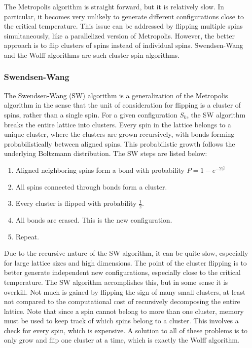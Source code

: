 \documentclass[a4paper]{article}
\begin{document}
The Metropolis algorithm is straight forward, but it is relatively slow. In particular, it becomes very unlikely to generate different configurations close to the critical temperature. This issue can be addressed by flipping multiple spins simultaneously, like a parallelized version of Metropolis. However, the better approach is to flip clusters of spins instead of individual spins. Swendsen-Wang and the Wolff algorithms are such cluster spin algorithms.

\subsubsection{Swendsen-Wang}

The Swendsen-Wang (SW) algorithm is a generalization of the Metropolis algorithm in the sense that the unit of consideration for flipping is a cluster of spins, rather than a single spin. For a given configuration $S_{k}$, the SW algorithm breaks the entire lattice into clusters. Every spin in the lattice belongs to a unique cluster, where the clusters are grown recursively, with bonds forming probabilistically between aligned spins. This probabilistic growth follows the underlying Boltzmann distribution. The SW steps are listed below:

\begin{enumerate}
	\item Aligned neighboring spins form a bond with probability $P=1-e^{-2\beta}$
	\item All spins connected through bonds form a cluster.
	\item Every cluster is flipped with probability $\frac{1}{2}$.
	\item All bonds are erased. This is the new configuration.
	\item Repeat.
\end{enumerate}

Due to the recursive nature of the SW algorithm, it can be quite slow, especially for large lattice sizes and high dimensions. The point of the cluster flipping is to better generate independent new configurations, especially close to the critical temperature. The SW algorithm accomplishes this, but in some sense it is overkill. Not much is gained by flipping the sign of many small clusters, at least not compared to the computational cost of recursively decomposing the entire lattice. Note that since a spin cannot belong to more than one cluster, memory must be used to keep track of which spins belong to a cluster. This involves a check for every spin, which is expensive. A solution to all of these problems is to only grow and flip one cluster at a time, which is exactly the Wolff algorithm.
\end{document}
